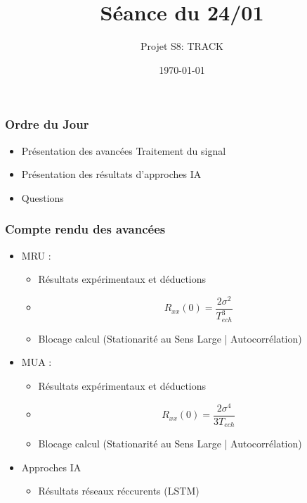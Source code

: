 \documentclass{beamer}
\title{Séance du 24/01}
\author{Projet S8: TRACK}
\institute[T2, Enseirb-Matmeca]{Département Télécommunication\\Enseirb-Matmeca, Bordeaux}
\date{\today}
\begin{document}
	
	\begin{frame}
		\titlepage
	\end{frame}
	
	\begin{frame}
		\frametitle{Ordre du Jour}
		\begin{itemize}
			\item Présentation des avancées Traitement du signal
			\item Présentation des résultats d'approches IA
			\item Questions 
		\end{itemize}
	\end{frame}
	
	\begin{frame}
		\frametitle{Compte rendu des avancées}
		\begin{itemize}
			\item MRU :
			\begin{itemize}
				\item[\hspace{1cm}] Résultats expérimentaux et déductions 
				\item[\hspace{1cm}] \[R_{xx}(0) = \frac{2\sigma^2}{T_{ech}^3} \]
				\item[\hspace{1cm}] Blocage calcul (Stationarité au Sens Large | Autocorrélation) 
			\end{itemize}
			\item MUA :
			\begin{itemize}
				\item[\hspace{1cm}] Résultats expérimentaux et déductions 
				\item[\hspace{1cm}] \[R_{xx}(0) = \frac{2\sigma^4}{3T_{ech}}\]
				\item[\hspace{1cm}] Blocage calcul (Stationarité au Sens Large | Autocorrélation) 
			\end{itemize}
			\item Approches IA
			\begin{itemize}
				\item[\hspace{1cm}] Résultats réseaux réccurents (LSTM)
			\end{itemize}
		\end{itemize}
	\end{frame}
	
\end{document}
